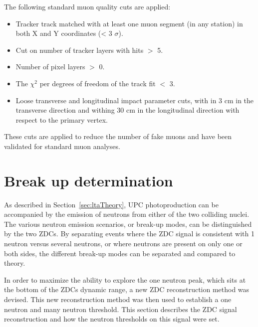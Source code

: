       The following standard muon quality cuts are applied:
      \begin{itemize}
        \item Tracker track matched with at least one muon segment 
          (in any station) in both X and Y coordinates (< 3 $\sigma$).
        \item Cut on number of tracker layers with hits $>$ 5.
        \item Number of pixel layers $>$ 0.
        \item The $\chi^{2}$ per degrees of freedom of the track fit $<$ 3. 
        \item Loose transverse and longitudinal impact parameter cuts, with in 3 
          cm in the transverse direction and withing 30 cm in the longitudinal 
          direction with respect to the primary vertex.
      \end{itemize}
      These cuts are applied to reduce the number of fake muons and have been 
        validated for standard muon analyses.

  \section{\label{sec:breakUpDet} Break up determination}
    As described in Section~\ref{sec:ltaTheory}, UPC \JPsi{} photoproduction 
      can be accompanied by the emission of neutrons from either of the two 
      colliding nuclei.
    The various neutron emission scenarios, or break-up modes, can 
      be distinguished by the two ZDCs.
    By separating events where the ZDC signal is consistent with 1 neutron 
      versus several neutrons, or where neutrons are present on only one or 
      both sides, the different break-up modes can be separated
      and compared to theory. 

    In order to maximize the ability to explore the one neutron peak, which 
      sits at the bottom of the ZDCs dynamic range, a new ZDC reconstruction 
      method was devised. 
    This new reconstruction method was then used to establish a one neutron and
      many neutron threshold.
    This section describes the ZDC signal reconstruction and how the neutron 
      thresholds on this signal were set.
    
